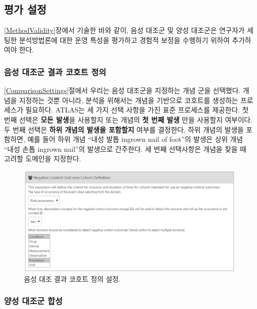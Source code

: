 \documentclass[10.5pt]{book}
\theoremstyle{definition}
\theoremstyle{definition}
\theoremstyle{definition}
\theoremstyle{remark}
\begin{document}
\subsection{평가 설정}\label{evaluationSettings}

\ref{MethodValidity}장에서 기술한 바와 같이, 음성 대조군 및 양성
대조군은 연구자가 세팅한 분석방법론에 대한 운영 특성을 평가하고 경험적
보정을 수행하기 위하여 추가하여야 한다.

\subsubsection*{음성 대조군 결과 코호트 정의}\label{----}

\ref{ComparisonSettings}절에서 우리는 음성 대조군을 지정하는 개념 군을
선택했다. 개념을 지정하는 것뿐 아니라, 분석을 위해서는 개념을 기반으로
코호트를 생성하는 프로세스가 필요하다. ATLAS는 세 가지 선택 사항을 가진
표준 프로세스를 제공한다. 첫 번째 선택은 \textbf{모든 발생}을 사용할지
또는 개념의 \textbf{첫 번째 발생} 만을 사용할지 여부이다. 두 번째 선택은
\textbf{하위 개념의 발생을 포함할지} 여부를 결정한다. 하위 개념의 발생을
포함하면, 예를 들어 하위 개념 ``내성 발톱 ingrown nail of foot''의
발생은 상위 개념 ``내성 손톱 ingrown nail''의 발생으로 간주한다. 세 번째
선택사항은 개념을 찾을 때 고려할 도메인을 지정한다.

\begin{figure}

{\centering \includegraphics[width=1\linewidth]{images/PopulationLevelEstimation/ncSettings} 

}

\caption{음성 대조 결과 코호트 정의 설정.}\label{fig:ncSettings}
\end{figure}

\subsubsection*{양성 대조군 합성}\label{--}
\end{document}
